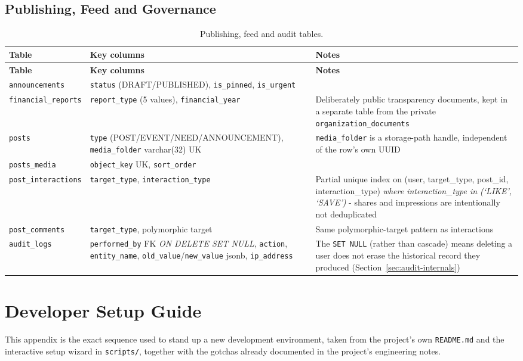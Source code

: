 \section{Publishing, Feed and Governance}
\begin{longtable}{|>{\raggedright\arraybackslash}p{}|>{\raggedright\arraybackslash}p{}|>{\raggedright\arraybackslash}p{}|}
\caption{Publishing, feed and audit tables.}\\\hline
\textbf{Table} & \textbf{Key columns} & \textbf{Notes}\\\hline
\endfirsthead\hline\textbf{Table} & \textbf{Key columns} & \textbf{Notes}\\\hline\endhead
\texttt{announcements} & \texttt{status} (DRAFT/PUBLISHED), \texttt{is\_pinned}, \texttt{is\_urgent} & \\\hline
\texttt{financial\_\allowbreak reports} & \texttt{report\_type} (5 values), \texttt{financial\_year} & Deliberately public transparency documents, kept in a separate table from the private \texttt{organization\_\allowbreak documents}\\\hline
\texttt{posts} & \texttt{type} (POST/\allowbreak EVENT/\allowbreak NEED/\allowbreak ANNOUNCEMENT), \texttt{media\_folder} varchar(32) UK & \texttt{media\_folder} is a storage-path handle, independent of the row's own UUID\\\hline
\texttt{posts\_media} & \texttt{object\_key} UK, \texttt{sort\_order} & \\\hline
\texttt{post\_\allowbreak interactions} & \texttt{target\_type}, \texttt{interaction\_type} & Partial unique index on (user, target\_type, post\_id, interaction\_type) \emph{where interaction\_type in (`LIKE', `SAVE')} - shares and impressions are intentionally not deduplicated\\\hline
\texttt{post\_comments} & \texttt{target\_type}, polymorphic target & Same polymorphic-target pattern as interactions\\\hline
\texttt{audit\_logs} & \texttt{performed\_by} FK \emph{ON DELETE SET NULL}, \texttt{action}, \texttt{entity\_name}, \texttt{old\_value}/\texttt{new\_value} jsonb, \texttt{ip\_address} & The \texttt{SET NULL} (rather than cascade) means deleting a user does not erase the historical record they produced (Section~\ref{sec:audit-internals})\\\hline
\end{longtable}

\endgroup

\chapter{Developer Setup Guide}
\label{app:setup}
\label{sec:setup-guide}
This appendix is the exact sequence used to stand up a new development environment, taken from the project's own \texttt{README.md} and the interactive setup wizard in \texttt{scripts/}, together with the gotchas already documented in the project's engineering notes.

